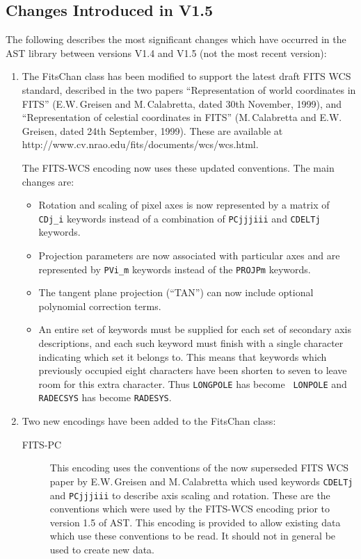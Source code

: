 \documentclass[twoside,11pt]{article}
\newcommand{\htmladdnormallink}[2]{#1}
\begin{document}
\subsection{Changes Introduced in V1.5}

The following describes the most significant changes which have
occurred in the AST library between versions V1.4 and V1.5 (not the most
recent version):

\begin{enumerate}

\item The FitsChan class has been modified to support the latest draft
FITS WCS standard, described in the two papers ``Representation of world
coordinates in FITS'' (E.W.\,Greisen and M.\,Calabretta, dated 30th
November, 1999), and ``Representation of celestial coordinates in FITS''
(M.\,Calabretta and E.W.\,Greisen, dated 24th September, 1999). These are
available at
\htmladdnormallink{http://www.cv.nrao.edu/fits/documents/wcs/wcs.html}
{http://www.cv.nrao.edu/fits/documents/wcs/wcs.html}.

The FITS-WCS encoding now uses these updated conventions. The main
changes are:

\begin{itemize}
\item Rotation and scaling of pixel axes is now represented by a matrix
of {\tt CDj\_i} keywords instead of a combination of {\tt PCjjjiii} and
{\tt CDELTj} keywords.
\item Projection parameters are now associated with particular axes and
are represented by {\tt PVi\_m} keywords instead of the {\tt PROJPm}
keywords.
\item The tangent plane projection (``TAN'') can now include optional 
polynomial correction terms.
\item An entire set of keywords must be supplied for each set of secondary 
axis descriptions, and each such keyword must finish with a single
character indicating which set it belongs to. This means that keywords
which previously occupied eight characters have been shorten to seven to
leave room for this extra character. Thus {\tt LONGPOLE} has become {\tt
LONPOLE} and {\tt RADECSYS} has become {\tt RADESYS}.
\end{itemize}

\item Two new encodings have been added to the FitsChan class:
\begin{description}

\item [FITS-PC] This encoding uses the conventions of the now superseded
FITS WCS paper by E.W.\,Greisen and M.\,Calabretta which used keywords
{\tt CDELTj} and {\tt PCjjjiii} to describe axis scaling and rotation.
These are the conventions which were used by the FITS-WCS encoding prior
to version 1.5 of AST. This encoding is provided to allow existing data
which use these conventions to be read. It should not in general be used
to create new data.


\end{description}
\end{enumerate}
\end{document}
